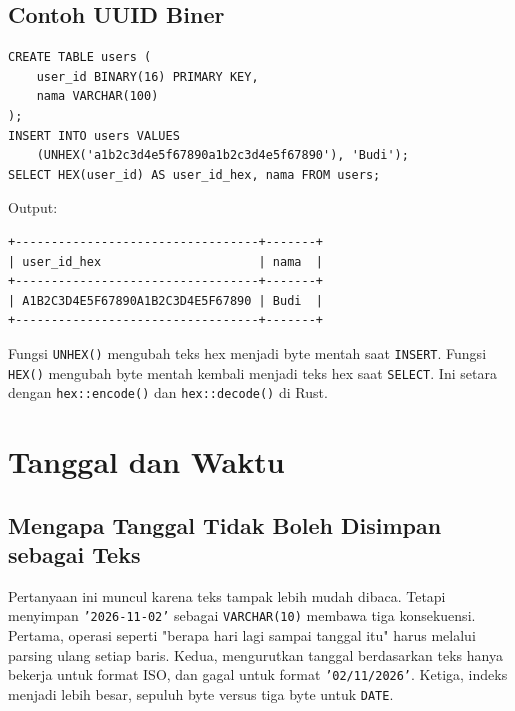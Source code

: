 \documentclass[11pt,a4paper]{article}
\begin{document}
\subsection{Contoh UUID Biner}

\begin{lstlisting}[style=code]
CREATE TABLE users (
    user_id BINARY(16) PRIMARY KEY,
    nama VARCHAR(100)
);
INSERT INTO users VALUES
    (UNHEX('a1b2c3d4e5f67890a1b2c3d4e5f67890'), 'Budi');
SELECT HEX(user_id) AS user_id_hex, nama FROM users;
\end{lstlisting}

Output:

\begin{lstlisting}[style=out]
+----------------------------------+-------+
| user_id_hex                      | nama  |
+----------------------------------+-------+
| A1B2C3D4E5F67890A1B2C3D4E5F67890 | Budi  |
+----------------------------------+-------+
\end{lstlisting}

Fungsi \texttt{UNHEX()} mengubah teks hex menjadi byte mentah saat \texttt{INSERT}. Fungsi \texttt{HEX()} mengubah byte mentah kembali menjadi teks hex saat \texttt{SELECT}. Ini setara dengan \texttt{hex::encode()} dan \texttt{hex::decode()} di Rust.

\section{Tanggal dan Waktu}

\subsection{Mengapa Tanggal Tidak Boleh Disimpan sebagai Teks}

Pertanyaan ini muncul karena teks tampak lebih mudah dibaca. Tetapi menyimpan \texttt{'2026-11-02'} sebagai \texttt{VARCHAR(10)} membawa tiga konsekuensi. Pertama, operasi seperti "berapa hari lagi sampai tanggal itu" harus melalui parsing ulang setiap baris. Kedua, mengurutkan tanggal berdasarkan teks hanya bekerja untuk format ISO, dan gagal untuk format \texttt{'02/11/2026'}. Ketiga, indeks menjadi lebih besar, sepuluh byte versus tiga byte untuk \texttt{DATE}.
\end{document}

